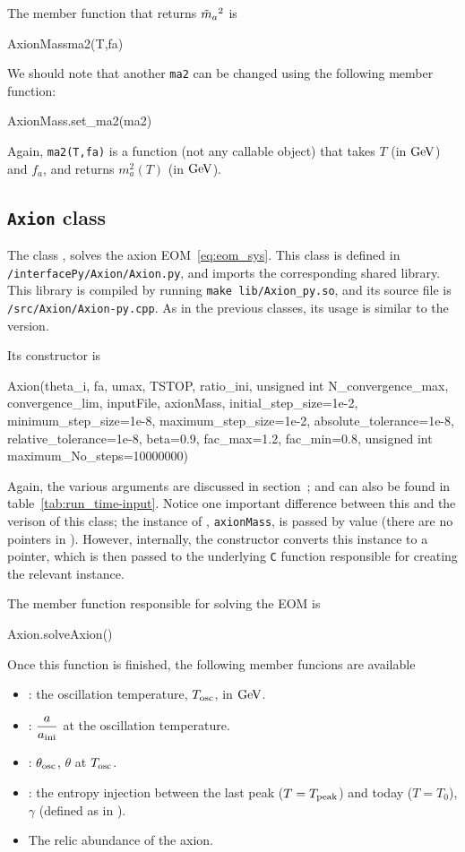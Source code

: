 \documentclass[11pt,a4paper]{article}
\begin{document}
The member function that returns $\tilde m_{a}{}^2$ is
%
\begin{py}
	AxionMassma2(T,fa)
\end{py}
%
We should note that another {\tt ma2} can be changed using the following member function:
%
\begin{py}
	AxionMass.set_ma2(ma2)
\end{py}
%
Again, {\tt ma2(T,fa)} is a function (not any callable object) that takes $T$ (in ${\rm GeV}$) and $f_a$, and returns  $m_a^2(T)$ (in ${\rm GeV}$).




\subsection{{\tt Axion} class}
%
The class , solves the axion EOM~\ref{eq:eom_sys}. This class is defined in {\tt \mimes/interfacePy/Axion/Axion.py}, and imports the corresponding shared library. This library is compiled by running {\tt make lib/Axion\_py.so}, and its source file is {\tt \mimes/src/Axion/Axion-py.cpp}. As in the previous classes, its usage is similar to the \CPP version.

Its constructor is 
%
\begin{py}
	Axion(theta_i, fa, umax, TSTOP, 
	ratio_ini, unsigned int N_convergence_max, convergence_lim, 
	inputFile, axionMass, initial_step_size=1e-2, 
	minimum_step_size=1e-8, maximum_step_size=1e-2, absolute_tolerance=1e-8, 
	relative_tolerance=1e-8, beta=0.9, fac_max=1.2, fac_min=0.8, 
	unsigned int maximum_No_steps=10000000)
\end{py}
%
Again, the various arguments are discussed in section~; and can also be found in table~\ref{tab:run_time-input}. Notice one important difference between this and the \CPP verison of this class; the instance of , {\tt axionMass}, is passed by value (there are no pointers in \PY). However, internally, the constructor converts this instance to a pointer, which is then passed to the underlying {\tt C} function responsible for creating the relevant instance.
%

The member function responsible for solving the EOM is
%
\begin{py}
	Axion.solveAxion()
\end{py}
%
Once this function is finished, the following member funcions are available
\begin{itemize}
	\item {}: the oscillation temperature, $T_{\rm osc}{}$, in ${\rm GeV}$.
	\item {}: $\dfrac{a}{a_{\rm ini}{}}$ at the oscillation temperature.
	\item {}: $\theta_{\rm osc}{}$, \ie $\theta$ at $T_{\rm osc}{}$.
	\item  {}: the entropy injection between the last peak ($T=T_{\rm peak}$) and today ($T=T_0$), $\gamma$ (defined as in ).
	\item {} The relic abundance of the axion.
\end{itemize}
\end{document}
